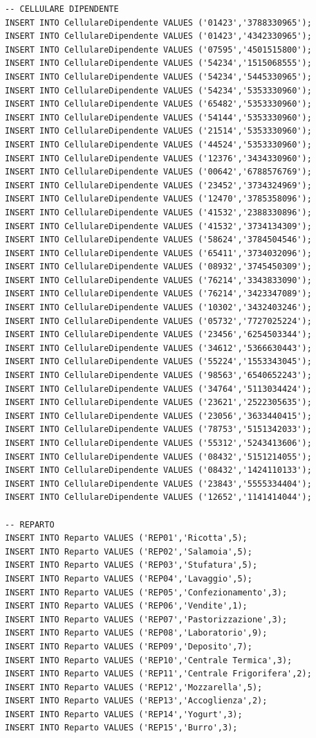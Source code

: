 \documentclass[12pt]{report}
\begin{document}
\begin{scriptsize}
\begin{verbatim}
-- CELLULARE DIPENDENTE
INSERT INTO CellulareDipendente VALUES ('01423','3788330965');
INSERT INTO CellulareDipendente VALUES ('01423','4342330965');
INSERT INTO CellulareDipendente VALUES ('07595','4501515800');
INSERT INTO CellulareDipendente VALUES ('54234','1515068555');
INSERT INTO CellulareDipendente VALUES ('54234','5445330965');
INSERT INTO CellulareDipendente VALUES ('54234','5353330960');
INSERT INTO CellulareDipendente VALUES ('65482','5353330960');
INSERT INTO CellulareDipendente VALUES ('54144','5353330960');
INSERT INTO CellulareDipendente VALUES ('21514','5353330960');
INSERT INTO CellulareDipendente VALUES ('44524','5353330960');
INSERT INTO CellulareDipendente VALUES ('12376','3434330960');
INSERT INTO CellulareDipendente VALUES ('00642','6788576769');
INSERT INTO CellulareDipendente VALUES ('23452','3734324969');
INSERT INTO CellulareDipendente VALUES ('12470','3785358096');
INSERT INTO CellulareDipendente VALUES ('41532','2388330896');
INSERT INTO CellulareDipendente VALUES ('41532','3734134309');
INSERT INTO CellulareDipendente VALUES ('58624','3784504546');
INSERT INTO CellulareDipendente VALUES ('65411','3734032096');
INSERT INTO CellulareDipendente VALUES ('08932','3745450309');
INSERT INTO CellulareDipendente VALUES ('76214','3343833090');
INSERT INTO CellulareDipendente VALUES ('76214','3423347089');
INSERT INTO CellulareDipendente VALUES ('10302','3432403246');
INSERT INTO CellulareDipendente VALUES ('05732','7727025224');
INSERT INTO CellulareDipendente VALUES ('23456','6254503344');
INSERT INTO CellulareDipendente VALUES ('34612','5366630443');
INSERT INTO CellulareDipendente VALUES ('55224','1553343045');
INSERT INTO CellulareDipendente VALUES ('98563','6540652243');
INSERT INTO CellulareDipendente VALUES ('34764','5113034424');
INSERT INTO CellulareDipendente VALUES ('23621','2522305635');
INSERT INTO CellulareDipendente VALUES ('23056','3633440415');
INSERT INTO CellulareDipendente VALUES ('78753','5151342033');
INSERT INTO CellulareDipendente VALUES ('55312','5243413606');
INSERT INTO CellulareDipendente VALUES ('08432','5151214055');
INSERT INTO CellulareDipendente VALUES ('08432','1424110133');
INSERT INTO CellulareDipendente VALUES ('23843','5555334404');
INSERT INTO CellulareDipendente VALUES ('12652','1141414044');

-- REPARTO
INSERT INTO Reparto VALUES ('REP01','Ricotta',5);
INSERT INTO Reparto VALUES ('REP02','Salamoia',5);
INSERT INTO Reparto VALUES ('REP03','Stufatura',5);
INSERT INTO Reparto VALUES ('REP04','Lavaggio',5);
INSERT INTO Reparto VALUES ('REP05','Confezionamento',3);
INSERT INTO Reparto VALUES ('REP06','Vendite',1);
INSERT INTO Reparto VALUES ('REP07','Pastorizzazione',3);
INSERT INTO Reparto VALUES ('REP08','Laboratorio',9);
INSERT INTO Reparto VALUES ('REP09','Deposito',7);
INSERT INTO Reparto VALUES ('REP10','Centrale Termica',3);
INSERT INTO Reparto VALUES ('REP11','Centrale Frigorifera',2);
INSERT INTO Reparto VALUES ('REP12','Mozzarella',5);
INSERT INTO Reparto VALUES ('REP13','Accoglienza',2);
INSERT INTO Reparto VALUES ('REP14','Yogurt',3);
INSERT INTO Reparto VALUES ('REP15','Burro',3);


\end{verbatim}
\end{scriptsize}
\end{document}
